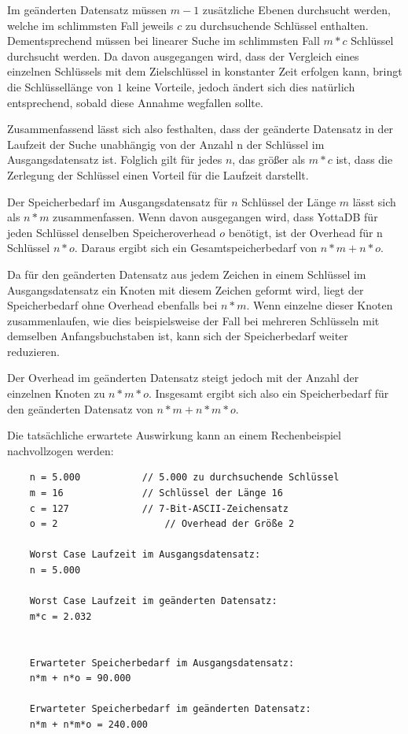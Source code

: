 \documentclass[oneside]{ausarbeitung}
\begin{document}
Im geänderten Datensatz müssen $m-1$ zusätzliche Ebenen durchsucht werden, welche im schlimmsten Fall jeweils $c$ zu durchsuchende Schlüssel enthalten. Dementsprechend müssen bei linearer Suche im schlimmsten Fall $m*c$ Schlüssel durchsucht werden. Da davon ausgegangen wird, dass der Vergleich eines einzelnen Schlüssels mit dem Zielschlüssel in konstanter Zeit erfolgen kann, bringt die Schlüssellänge von $1$ keine Vorteile, jedoch ändert sich dies natürlich entsprechend, sobald diese Annahme wegfallen sollte.
	
Zusammenfassend lässt sich also festhalten, dass der geänderte Datensatz in der Laufzeit der Suche unabhängig von der Anzahl n der Schlüssel im Ausgangsdatensatz ist. Folglich gilt für jedes $n$, das größer als $m*c$ ist, dass die Zerlegung der Schlüssel einen Vorteil für die Laufzeit darstellt. 
	
\pagebreak
	
Der Speicherbedarf im Ausgangsdatensatz für $n$ Schlüssel der Länge $m$ lässt sich als $n*m$ zusammenfassen. Wenn davon ausgegangen wird, dass YottaDB für jeden Schlüssel denselben Speicheroverhead $o$ benötigt, ist der Overhead für n Schlüssel $n*o$. Daraus ergibt sich ein Gesamtspeicherbedarf von $n*m + n*o$.

Da für den geänderten Datensatz aus jedem Zeichen in einem Schlüssel im Ausgangsdatensatz ein Knoten mit diesem Zeichen geformt wird, liegt der Speicherbedarf ohne Overhead ebenfalls bei $n*m$. Wenn einzelne dieser Knoten zusammenlaufen, wie dies beispielsweise der Fall bei mehreren Schlüsseln mit demselben Anfangsbuchstaben ist, kann sich der Speicherbedarf weiter reduzieren.

Der Overhead im geänderten Datensatz steigt jedoch mit der Anzahl der einzelnen Knoten zu $n*m*o$. Insgesamt ergibt sich also ein Speicherbedarf für den geänderten Datensatz von $n*m + n*m*o$. 

Die tatsächliche erwartete Auswirkung kann an einem Rechenbeispiel nachvollzogen werden:

\begin{lstlisting}
	n = 5.000			// 5.000 zu durchsuchende Schlüssel
	m = 16				// Schlüssel der Länge 16
	c = 127				// 7-Bit-ASCII-Zeichensatz
	o = 2					// Overhead der Größe 2
	
	Worst Case Laufzeit im Ausgangsdatensatz:
	n = 5.000
	
	Worst Case Laufzeit im geänderten Datensatz:
	m*c = 2.032
	
	
	Erwarteter Speicherbedarf im Ausgangsdatensatz:
	n*m + n*o = 90.000
	
	Erwarteter Speicherbedarf im geänderten Datensatz:
	n*m + n*m*o = 240.000
\end{lstlisting}
\end{document}
